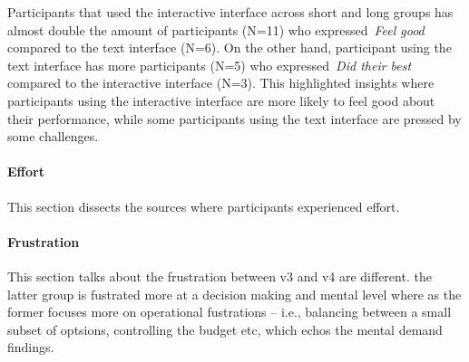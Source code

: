 Participants that used the interactive interface across short and long groups has almost double the amount of participants (N=11) who expressed~\textit{Feel good} compared to the text interface (N=6). On the other hand, participant using the text interface has more participants (N=5) who expressed~\textit{Did their best} compared to the interactive interface (N=3). This highlighted insights where participants using the interactive interface are more likely to feel good about their performance, while some participants using the text interface are pressed by some challenges.

\paragraph{Effort} This section dissects the sources where participants experienced effort.

\paragraph{Frustration} This section talks about the frustration between v3 and v4 are different. the latter group is fustrated more at a decision making and mental level where as the former focuses more on operational fustrations -- i.e., balancing between a small subset of optsions, controlling the budget etc, which echos the mental demand findings.





